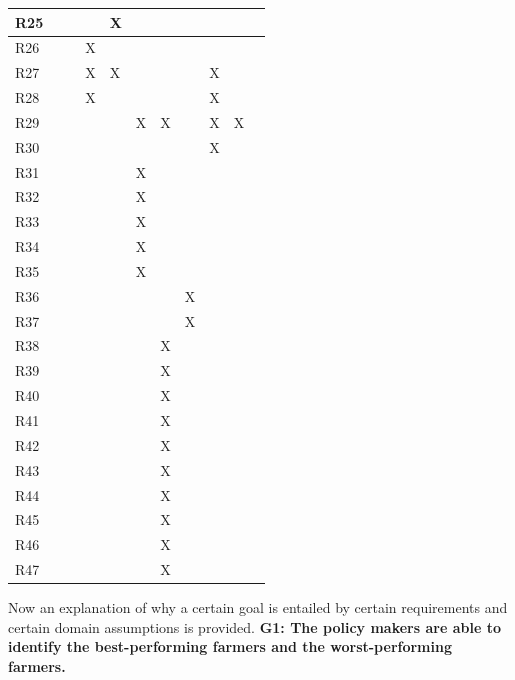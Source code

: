 \documentclass{article}
\begin{document}
\begin{longtable}[c]{|m{0.15cm}|m{0.15cm}|m{0.15cm}|m{0.15cm}|m{0.15cm}|m{0.15cm}|m{0.15cm}|m{0.15cm}|m{0.15cm}|m{0.15cm}|m{0.15cm}|}
 \hline
 R25 &   &   &   & X  &   &   &   &   &     \\
 \hline
 R26 &   &   & X  &   &  &   &   &   &      \\
 \hline
 R27 &   &   & X  & X  &  &   &   & X  &      \\
 \hline
 R28 &   &   & X  &   &   &  &   &  X &      \\
 \hline
 R29 &   &   &   &   & X  & X &   & X  & X  \\
 \hline
 R30 &   &   &   &   &   &  &   & X  &      \\
 \hline
 R31 &   &   &   &   & X  &  &   &   &      \\
 \hline
 R32 &   &   &   &   & X  &  &   &   &      \\
 \hline
 R33 &   &   &   &   & X  &  &   &   &      \\
 \hline
 R34 &   &   &   &   & X  &   &   &  &      \\
 \hline
 R35 &   &   &   &   & X  &   &   &  &      \\
 \hline
 R36 &   &   &   &   &   &   & X  &  &      \\
 \hline
 R37 &   &   &   &   &   &   & X  &  &      \\
 \hline
 R38 &   &   &   &   &   & X  &  &   &     \\
 \hline
 R39 &   &   &   &   &   & X  &  &   &     \\
 \hline
 R40 &   &   &   &   &   & X  &  &   &     \\
 \hline
 R41 &   &   &   &   &   & X  &  &   &      \\
 \hline
 R42 &   &   &   &   &   & X  &  &   &      \\
 \hline
 R43 &   &   &   &   &   & X  &  &   &      \\
 \hline
 R44 &   &   &   &   &   & X  &  &   &      \\
 \hline
 R45 &   &   &   &   &   &  X &  &   &      \\
 \hline
 R46 &   &   &   &   &   &  X &  &   &      \\
 \hline
 R47 &   &   &   &   &   & X  &  &   &      \\
 \hline
\end{longtable}
Now an explanation of why a certain goal is entailed by certain requirements and certain domain assumptions is provided.
\vspace{1cm}
\newline
\textbf{G1: The policy makers are able to identify the best-performing farmers and the worst-performing farmers.}
\end{document}
